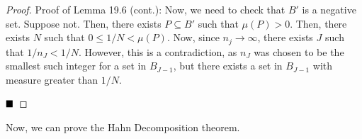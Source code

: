 
\begin{proof}{Proof of Lemma 19.6 (cont.):}
    Now, we need to check that $B'$ is a negative set. Suppose not. Then, there exists $P \subseteq B'$ such that $\mu(P) > 0$. Then, there exists $N$ such that $0 \leq 1/N < \mu(P)$. Now, since $n_j \to \infty$, there exists $J$ such that $1/n_J < 1/N$. However, this is a contradiction, as $n_J$ was chosen to be the smallest such integer for a set in $B_{J - 1}$, but there exists a set in $B_{J - 1}$ with measure greater than $1/N$.

    $\qed$
\end{proof}
Now, we can prove the Hahn Decomposition theorem.
\vspace{0.5cm}

